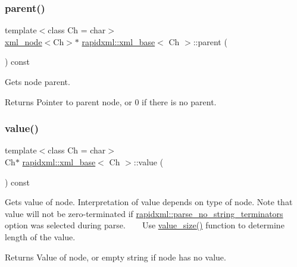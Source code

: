 \subsubsection{\texorpdfstring{parent()}{parent()}\hspace{0.1cm}{\footnotesize\ttfamily [2/2]}}
{\footnotesize\ttfamily template$<$class Ch  = char$>$ \\
\mbox{\hyperlink{classrapidxml_1_1xml__node}{xml\+\_\+node}}$<$Ch$>$$\ast$ \mbox{\hyperlink{classrapidxml_1_1xml__base}{rapidxml\+::xml\+\_\+base}}$<$ Ch $>$\+::parent (\begin{DoxyParamCaption}{ }\end{DoxyParamCaption}) const\hspace{0.3cm}{\ttfamily [inline]}}

Gets node parent. \begin{DoxyReturn}{Returns}
Pointer to parent node, or 0 if there is no parent. 
\end{DoxyReturn}
\mbox{\label{classrapidxml_1_1xml__base_a6af65de5e59ac497cd69838f8a89d602}} 
\subsubsection{\texorpdfstring{value()}{value()}\hspace{0.1cm}{\footnotesize\ttfamily [1/6]}}
{\footnotesize\ttfamily template$<$class Ch  = char$>$ \\
Ch$\ast$ \mbox{\hyperlink{classrapidxml_1_1xml__base}{rapidxml\+::xml\+\_\+base}}$<$ Ch $>$\+::value (\begin{DoxyParamCaption}{ }\end{DoxyParamCaption}) const\hspace{0.3cm}{\ttfamily [inline]}}

Gets value of node. Interpretation of value depends on type of node. Note that value will not be zero-\/terminated if \mbox{\hyperlink{namespacerapidxml_af3fc88ba6bee33482a2db81b1da36ea1}{rapidxml\+::parse\+\_\+no\+\_\+string\+\_\+terminators}} option was selected during parse. ~\newline
~\newline
 Use \mbox{\hyperlink{classrapidxml_1_1xml__base_a2eb123d471b1567fa4832b6ee2b75493}{value\+\_\+size()}} function to determine length of the value. \begin{DoxyReturn}{Returns}
Value of node, or empty string if node has no value. 
\end{DoxyReturn}
\mbox{\label{classrapidxml_1_1xml__base_a6af65de5e59ac497cd69838f8a89d602}} 
